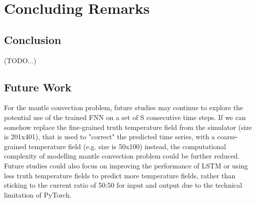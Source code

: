 \chapter{Concluding Remarks}\label{chap:conclusion}

\section{Conclusion}
(TODO...)

\section{Future Work}
For the mantle convection problem, future studies may continue to explore the potential use of the trained FNN on a set of S consecutive time steps. If we can somehow replace the fine-grained truth temperature field from the simulator (size is 201x401), that is used to "correct" the predicted time series, with a coarse-grained temperature field (e.g. size is 50x100) instead, the computational complexity of modelling mantle convection problem could be further reduced. Future studies could also focus on improving the performance of LSTM or using less truth temperature fields to predict more temperature fields, rather than sticking to the current ratio of 50:50 for input and output due to the technical limitation of PyTorch.
